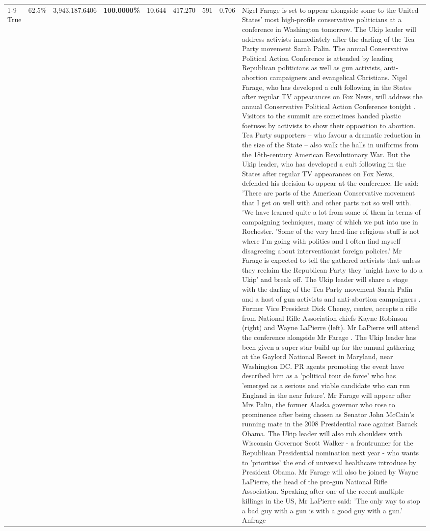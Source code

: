 \begin{table}[H]
\begin{tabular}{lllrlllll}
\cline{1-9}
True & 62.5\% & 3,943,187.6406 & \bfseries \color{red} 100.0000\% & 10.644 & 417.270 & 591 & 0.706 & Nigel Farage is set to appear alongside some to the United States' most high-profile conservative politicians at a conference in Washington tomorrow. The Ukip leader will address activists immediately after the darling of the Tea Party movement Sarah Palin. The annual Conservative Political Action Conference is attended by leading Republican politicians as well as gun activists, anti-abortion campaigners and evangelical Christians. Nigel Farage, who has developed a cult following in the States after regular TV appearances on Fox News, will address the annual Conservative Political Action Conference tonight . Visitors to the summit are sometimes handed plastic foetuses by activists to show their opposition to abortion. Tea Party supporters – who favour a dramatic reduction in the size of the State – also walk the halls in uniforms from the 18th-century American Revolutionary War. But the Ukip leader, who has developed a cult following in the States after regular TV appearances on Fox News, defended his decision to appear at the conference. He said: 'There are parts of the American Conservative movement that I get on well with and other parts not so well with. 'We have learned quite a lot from some of them in terms of campaigning techniques, many of which we put into use in Rochester. 'Some of the very hard-line religious stuff is not where I'm going with politics and I often find myself disagreeing about interventionist foreign policies.' Mr Farage is expected to tell the gathered activists that unless they reclaim the Republican Party they 'might have to do a Ukip' and break off. The Ukip leader will share a stage with the darling of the Tea Party movement Sarah Palin and a host of gun activists and anti-abortion campaigners . Former Vice President Dick Cheney, centre, accepts a rifle from National Rifle Association chiefs Kayne Robinson (right) and Wayne LaPierre (left). Mr LaPierre will attend the conference alongside Mr Farage . The Ukip leader has been given a super-star build-up for the annual gathering at the Gaylord National Resort in Maryland, near Washington DC. PR agents promoting the event have described him as a 'political tour de force' who has 'emerged as a serious and viable candidate who can run England in the near future'. Mr Farage will appear after Mrs Palin, the former Alaska governor who rose to prominence after being chosen as Senator John McCain's running mate in the 2008 Presidential race against Barack Obama. The Ukip leader will also rub shoulders with Wisconsin Governor Scott Walker - a frontrunner for the Republican Presidential nomination next year - who wants to 'prioritise' the end of universal healthcare introduce by President Obama. Mr Farage will also be joined by Wayne LaPierre, the head of the pro-gun National Rifle Association. Speaking after one of the recent multiple killings in the US, Mr LaPierre said: 'The only way to stop a bad guy with a gun is with a good guy with a gun.' Anfrage \\

\end{tabular}
\end{table}
